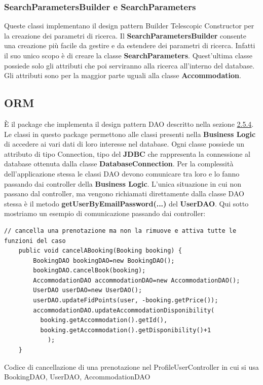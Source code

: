 \documentclass[10pt]{article}
\begin{document}
\subsubsection{SearchParametersBuilder e SearchParameters}

Queste classi implementano il design pattern Builder Telescopic Constructor per la creazione dei parametri di ricerca. Il \textbf{SearchParametersBuilder} consente una creazione più facile da gestire e da estendere dei parametri di ricerca. Infatti il suo unico scopo è di creare la classe \textbf{SearchParameters}. Quest'ultima classe possiede solo gli attributi che poi serviranno alla ricerca all'interno del database. Gli attributi sono per la maggior parte uguali alla classe \textbf{Accommodation}.

\subsection{ORM}

\`E il package che implementa il design pattern DAO descritto nella sezione \hyperref[daosec]{2.5.4}. Le classi in questo package permettono alle classi presenti nella \textbf{Business Logic} di accedere ai vari dati di loro interesse nel database. Ogni classe possiede un attributo di tipo Connection, tipo del \textbf{JDBC} che rappresenta la connessione al database ottenuta dalla classe \textbf{DatabaseConnection}. Per la complessità dell'applicazione stessa le classi DAO devono comunicare tra loro e lo fanno passando dai controller della \textbf{Business Logic}. L'unica situazione in cui non passano dal controller, ma vengono richiamati direttamente dalla classe DAO stessa è il metodo \textbf{getUserByEmailPassword(...)} del \textbf{UserDAO}.
\newline
Qui sotto mostriamo un esempio di comunicazione passando dai controller:
\begin{lstlisting}
// cancella una prenotazione ma non la rimuove e attiva tutte le funzioni del caso
    public void cancelABooking(Booking booking) {
        BookingDAO bookingDAO=new BookingDAO();
        bookingDAO.cancelBook(booking);
        AccommodationDAO accommodationDAO=new AccommodationDAO();
        UserDAO userDAO=new UserDAO();
        userDAO.updateFidPoints(user, -booking.getPrice());
        accommodationDAO.updateAccommodationDisponibility(
          booking.getAccommodation().getId(),
          booking.getAccommodation().getDisponibility()+1
            );
    }
\end{lstlisting}
\medskip
Codice di cancellazione di una prenotazione nel ProfileUserController in cui si usa BookingDAO, UserDAO, AccommodationDAO
\medskip
\end{document}
